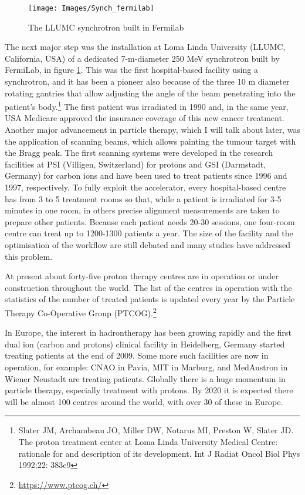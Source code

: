 \documentclass[12pt, a4paper, twoside]{book}
\begin{document}
\begin{figure}[!t]
\centering
{\texttt{[image: Images/Synch\_fermilab]}}
\caption{The LLUMC synchrotron built in Fermilab}
\label{fig:synchF}
\end{figure}
The next major step was the installation at Loma Linda University (LLUMC, California, USA) of a dedicated 7-m-diameter 250 MeV synchrotron built by FermiLab, in figure \ref{fig:synchF}. This was the first hospital-based facility using a synchrotron, and it has been a pioneer also because of the three 10 m diameter rotating gantries that allow adjusting the angle of the beam penetrating into the patient's body.\footnote{Slater JM, Archambeau JO, Miller DW, Notarus MI, Preston W, Slater JD. The proton treatment center at Loma Linda University Medical Centre: rationale
for and description of its development. Int J Radiat Oncol Biol Phys 1992;22: 383e9} The first patient was irradiated in 1990 and, in the same year, USA Medicare approved the insurance coverage of this new cancer treatment.
Another major advancement in particle therapy, which I will talk about later, was the application of scanning beams, which allows painting the tumour target with the Bragg peak.
The first scanning systems were developed in the research facilities at PSI (Villigen, Switzerland) for protons and GSI (Darmstadt, Germany) for carbon ions and have been used to treat patients since 1996 and 1997, respectively.
To fully exploit the accelerator, every hospital-based centre has from 3 to 5 treatment rooms so that, while a patient is irradiated for 3-5 minutes in one room, in others precise alignment measurements are taken to prepare other patients. Because each patient needs 20-30 sessions, one four-room centre can treat up to 1200-1300 patients a year. The size of the facility and the optimisation of the workflow are still debated and many studies have addressed this problem.

At present about forty-five proton therapy centres are in operation or under construction throughout the world. The list of the centres in operation with the statistics of the number of treated patients is updated every year by the Particle Therapy Co-Operative Group (PTCOG).\footnote{\url{https://www.ptcog.ch/}}



In Europe, the interest in hadrontherapy has been growing rapidly and the first dual ion (carbon and protons) clinical facility in Heidelberg, Germany started treating patients at the end of 2009. Some more such facilities are now in operation, for example: CNAO in Pavia, MIT in Marburg, and MedAustron in Wiener Neustadt are treating patients.
Globally there is a huge momentum in particle therapy, especially treatment with protons. By 2020 it is expected there will be almost 100 centres around the world, with over 30 of these in Europe.
\end{document}
